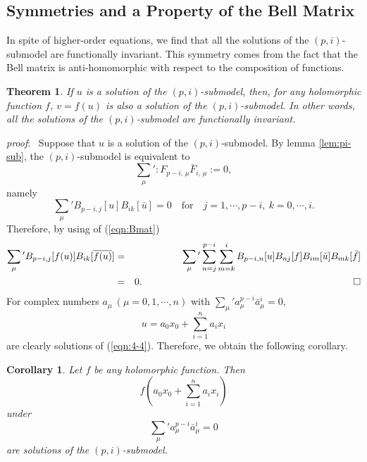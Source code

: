 \documentclass[makeidx,12pt,openany]{report}
\newtheorem{thm}[df]{Theorem}
\newtheorem{cor}[df]{Corollary}
\begin{document}
 \subsection{Symmetries and a Property of the Bell Matrix}
In spite of higher-order equations, we find that all the solutions of 
the $(p,i)$-submodel are functionally invariant. 
This symmetry comes from the fact that the Bell matrix is anti-homomorphic 
with respect to the composition of functions. 
\begin{thm}\label{thm:backlund}
If $u$ is a solution of the $(p,i)$-submodel, 
then, for any holomorphic function 
$f$, $v=f(u)$ is also a solution of 
the $(p,i)$-submodel. In other words, all the solutions of the 
$(p,i)$-submodel are functionally invariant. 
\end{thm}
\textit{proof}: \ 
Suppose that $u$ is a solution of the $(p,i)$-submodel. 
By lemma \ref{lem:pi-sub}, 
the $(p,i)$-submodel is equivalent to 
\begin{equation}
  \sum_{\mu}{}':F_{p-i,\, \mu}\bar{F}_{i,\, \mu}:=0, 
\end{equation}
namely
\begin{equation}
 \sum_{\mu}{}' B_{p-i,j}[u]B_{ik}[\bar{u}]=0
 \quad \mbox{for} \quad j=1,\cdots, p-i, \ k=0,\cdots,i. 
\end{equation}
Therefore, by using of (\ref{eqn:Bmat})
\begin{eqnarray*}
 \sum_{\mu}{}' B_{p-i,j}[f(u)]B_{ik}[\overline{f(u)}]
 &=&
 \sum_{\mu}{}' \sum_{n=j}^{p-i} \sum_{m=k}^i 
     B_{p-i,n}[u]B_{nj}[f] B_{im}[\bar{u}]B_{mk}[\bar{f}] \\
 &=& 0. \hspace{7cm} \qed
\end{eqnarray*}
%
For complex numbers $a_{\mu} \ (\mu =0,1,\cdots,n)$ with 
$\sum_{\mu}{}'a_{\mu}^{p-i}\bar{a}_{\mu}^i=0$, 
\begin{equation}
 u=a_0 x_0+\sum_{i=1}^n a_i x_i
\end{equation}
are clearly solutions of (\ref{eqn:4-4}). 
Therefore, we obtain the following corollary. 
\begin{cor}
Let $f$ be any holomorphic 
function. Then
\begin{equation}
 f(a_0 x_0+\sum_{i=1}^n a_i x_i)
\end{equation}
under
\begin{equation}
 \sum_{\mu}{}'a_{\mu}^{p-i}\bar{a}_{\mu}^i=0
\end{equation}
are solutions of the $(p,i)$-submodel.
\end{cor}
\end{document}
